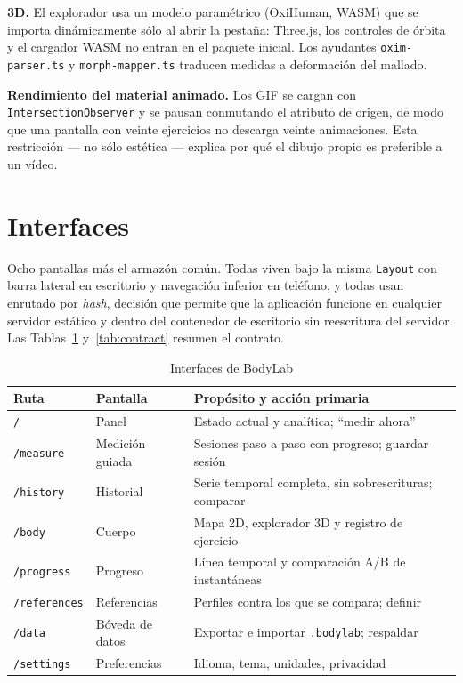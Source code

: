\documentclass[conference]{IEEEtran}
\newcommand{\code}[1]{\texttt{\small #1}}
\begin{document}
\textbf{3D.} El explorador usa un modelo param\'etrico (OxiHuman, WASM) que se
importa din\'amicamente s\'olo al abrir la pesta\~na: Three.js, los controles de
\'orbita y el cargador WASM no entran en el paquete inicial. Los ayudantes
\code{oxim-parser.ts} y \code{morph-mapper.ts} traducen medidas a deformaci\'on
del mallado.

\textbf{Rendimiento del material animado.} Los GIF se cargan con
\code{IntersectionObserver} y se pausan conmutando el atributo de origen, de modo
que una pantalla con veinte ejercicios no descarga veinte animaciones. Esta
restricci\'on --- no s\'olo est\'etica --- explica por qu\'e el dibujo propio es
preferible a un v\'ideo.

\section{Interfaces}

Ocho pantallas m\'as el armaz\'on com\'un. Todas viven bajo la misma
\code{Layout} con barra lateral en escritorio y navegaci\'on inferior en
tel\'efono, y todas usan enrutado por \emph{hash}, decisi\'on que permite que la
aplicaci\'on funcione en cualquier servidor est\'atico y dentro del contenedor de
escritorio sin reescritura del servidor. Las Tablas~\ref{tab:screens}
y~\ref{tab:contract} resumen el contrato.

\begin{table}[t]
\caption{Interfaces de BodyLab}
\label{tab:screens}
\centering
\footnotesize
\begin{tabular}{@{}llp{26mm}@{}}
\toprule
Ruta & Pantalla & Prop\'osito y acci\'on primaria \\
\midrule
\code{/} & Panel & Estado actual y anal\'itica; ``medir ahora'' \\
\code{/measure} & Medici\'on guiada & Sesiones paso a paso con progreso; guardar sesi\'on \\
\code{/history} & Historial & Serie temporal completa, sin sobrescrituras; comparar \\
\code{/body} & Cuerpo & Mapa 2D, explorador 3D y registro de ejercicio \\
\code{/progress} & Progreso & L\'inea temporal y comparaci\'on A/B de instant\'aneas \\
\code{/references} & Referencias & Perfiles contra los que se compara; definir \\
\code{/data} & B\'oveda de datos & Exportar e importar \code{.bodylab}; respaldar \\
\code{/settings} & Preferencias & Idioma, tema, unidades, privacidad \\
\bottomrule
\end{tabular}
\end{table}
\end{document}

